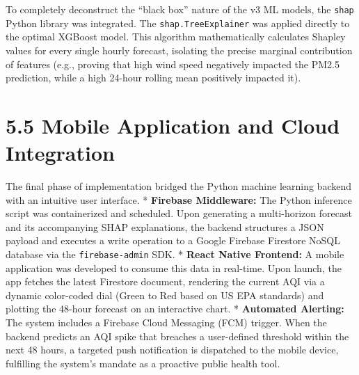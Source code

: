 To completely deconstruct the ``black box'' nature of the v3 ML models,
the \texttt{shap} Python library was integrated. The
\texttt{shap.TreeExplainer} was applied directly to the optimal XGBoost
model. This algorithm mathematically calculates Shapley values for every
single hourly forecast, isolating the precise marginal contribution of
features (e.g., proving that high wind speed negatively impacted the
PM2.5 prediction, while a high 24-hour rolling mean positively impacted
it).

\section{5.5 Mobile Application and Cloud
Integration}\label{mobile-application-and-cloud-integration}

The final phase of implementation bridged the Python machine learning
backend with an intuitive user interface. * \textbf{Firebase
Middleware:} The Python inference script was containerized and
scheduled. Upon generating a multi-horizon forecast and its accompanying
SHAP explanations, the backend structures a JSON payload and executes a
write operation to a Google Firebase Firestore NoSQL database via the
\texttt{firebase-admin} SDK. * \textbf{React Native Frontend:} A mobile
application was developed to consume this data in real-time. Upon
launch, the app fetches the latest Firestore document, rendering the
current AQI via a dynamic color-coded dial (Green to Red based on US EPA
standards) and plotting the 48-hour forecast on an interactive chart. *
\textbf{Automated Alerting:} The system includes a Firebase Cloud
Messaging (FCM) trigger. When the backend predicts an AQI spike that
breaches a user-defined threshold within the next 48 hours, a targeted
push notification is dispatched to the mobile device, fulfilling the
system's mandate as a proactive public health tool.

